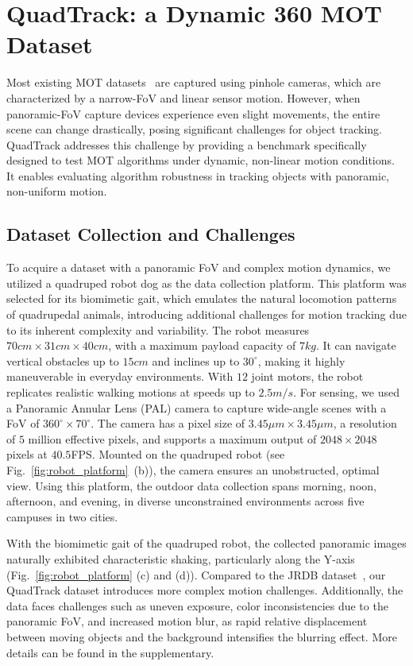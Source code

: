 
%
\section{QuadTrack: a Dynamic 360{\textdegree} MOT Dataset}
\label{sec:QuadTrack}

%
Most existing MOT datasets~\cite{milan2016mot16,dendorfer2020mot20,peize2021dance} are captured using pinhole cameras, which are characterized by a narrow-FoV and linear sensor motion.
However, when panoramic-FoV capture devices experience even slight movements, the entire scene can change drastically, posing significant challenges for object tracking.
QuadTrack addresses this challenge by providing a benchmark specifically designed to test MOT algorithms under dynamic, non-linear motion conditions. 
%
It enables evaluating algorithm robustness in tracking objects with panoramic, non-uniform motion.
%

\subsection{Dataset Collection and Challenges}
To acquire a dataset with a panoramic FoV and complex motion dynamics, we utilized a quadruped robot dog as the data collection platform. This platform was selected for its biomimetic gait, which emulates the natural locomotion patterns of quadrupedal animals, introducing additional challenges for motion tracking due to its inherent complexity and variability. 
The robot measures $70cm{\times}31cm{\times}40cm$, with a maximum payload capacity of $7kg$. It can navigate vertical obstacles up to $15cm$ and inclines up to $30^{\circ}$, making it highly maneuverable in everyday environments. 
With $12$ joint motors, the robot replicates realistic walking motions at speeds up to $2.5m/s$.
For sensing, we used a Panoramic Annular Lens (PAL) camera to capture wide-angle scenes with a FoV of $360^\circ{\times}70^{\circ}$. 
The camera has a pixel size of $3.45{\mu}m{\times}3.45{\mu}m$, a resolution of $5$ million effective pixels, and supports a maximum output of $2048{\times}2048$ pixels at $40.5$FPS. 
Mounted on the quadruped robot (see Fig.~\ref{fig:robot_platform}~(b)), the camera ensures an unobstructed, optimal view. 
Using this platform, the outdoor data collection spans morning, noon, afternoon, and evening, in diverse unconstrained environments across five campuses in two cities.

With the biomimetic gait of the quadruped robot, the collected panoramic images naturally exhibited characteristic shaking, particularly along the Y-axis (Fig.~\ref{fig:robot_platform} (c) and (d)).
Compared to the JRDB dataset~\cite{martin2021jrdb}, our QuadTrack dataset introduces more complex motion challenges. Additionally, the data faces challenges such as uneven exposure, color inconsistencies due to the panoramic FoV, and increased motion blur, as rapid relative displacement between moving objects and the background intensifies the blurring effect. 
More details can be found in the supplementary.


